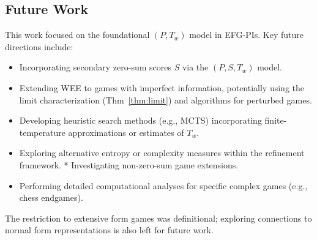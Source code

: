 \documentclass{article}
\begin{document}
\subsection{Future Work}
This work focused on the foundational $(P, T_w)$ model in EFG-PIs. Key future directions include:
\begin{itemize}
    \item Incorporating secondary zero-sum scores $S$ via the $(P, S, T_w)$ model.
    \item Extending WEE to games with imperfect information, potentially using the limit characterization (Thm~\ref{thm:limit}) and algorithms for perturbed games.
    \item Developing heuristic search methods (e.g., MCTS) incorporating finite-temperature approximations or estimates of $T_w$.
    \item Exploring alternative entropy or complexity measures within the refinement framework.
    * Investigating non-zero-sum game extensions.
    \item Performing detailed computational analyses for specific complex games (e.g., chess endgames).
\end{itemize}
The restriction to extensive form games was definitional; exploring connections to normal form representations is also left for future work.
\end{document}
